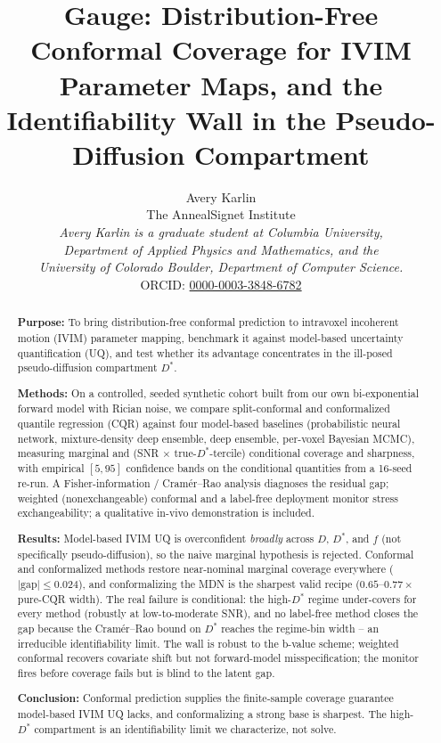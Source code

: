 \documentclass[11pt]{article}
\title{\textbf{Gauge: Distribution-Free Conformal Coverage for IVIM Parameter
Maps, and the Identifiability Wall in the Pseudo-Diffusion Compartment}}
\author{Avery Karlin\\[2pt]
\small The AnnealSignet Institute\\[3pt]
\small \textit{Avery Karlin is a graduate student at Columbia University,}\\[1pt]
\small \textit{Department of Applied Physics and Mathematics, and the}\\[1pt]
\small \textit{University of Colorado Boulder, Department of Computer Science.}\\[3pt]
\small ORCID: \href{https://orcid.org/0000-0003-3848-6782}{0000-0003-3848-6782}}
\date{}
\newcommand{\Dstar}{D^{*}}
\begin{document}
\maketitle

\begin{abstract}
\noindent
\textbf{Purpose:} To bring distribution-free conformal prediction to intravoxel
incoherent motion (IVIM) parameter mapping, benchmark it against model-based
uncertainty quantification (UQ), and test whether its advantage concentrates in
the ill-posed pseudo-diffusion compartment $\Dstar$.

\noindent
\textbf{Methods:} On a controlled, seeded synthetic cohort built from our own
bi-exponential forward model with Rician noise, we compare split-conformal and
conformalized quantile regression (CQR) against four model-based baselines
(probabilistic neural network, mixture-density deep ensemble, deep ensemble,
per-voxel Bayesian MCMC), measuring marginal and (SNR $\times$
true-$\Dstar$-tercile) conditional coverage and sharpness, with empirical
$[5,95]$ confidence bands on the conditional quantities from a 16-seed re-run. A
Fisher-information / Cram\'er--Rao analysis diagnoses the residual gap; weighted
(nonexchangeable) conformal and a label-free deployment monitor stress
exchangeability; a qualitative in-vivo demonstration is included.

\noindent
\textbf{Results:} Model-based IVIM UQ is overconfident \emph{broadly} across $D$,
$\Dstar$, and $f$ (not specifically pseudo-diffusion), so the naive marginal
hypothesis is rejected. Conformal and conformalized methods restore near-nominal
marginal coverage everywhere ($|\text{gap}|\le 0.024$), and conformalizing the MDN
is the sharpest valid recipe ($0.65$--$0.77\times$ pure-CQR width). The real
failure is conditional: the high-$\Dstar$ regime under-covers for every method
(robustly at low-to-moderate SNR), and no label-free method closes the gap because the Cram\'er--Rao bound
on $\Dstar$ reaches the regime-bin width -- an irreducible identifiability limit.
The wall is robust to the b-value scheme; weighted conformal recovers covariate
shift but not forward-model misspecification; the monitor fires before coverage
fails but is blind to the latent gap.

\noindent
\textbf{Conclusion:} Conformal prediction supplies the finite-sample coverage
guarantee model-based IVIM UQ lacks, and conformalizing a strong base is sharpest.
The high-$\Dstar$ compartment is an identifiability limit we characterize, not
solve.
\end{abstract}
\end{document}
